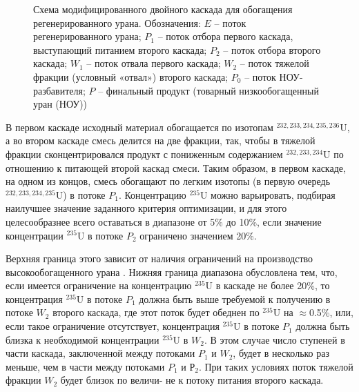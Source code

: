 \begin{figure}[ht]
    \caption{Схема модифицированного двойного каскада для обогащения регенерированного урана. Обозначения: $E$ -- поток регенерированного урана; $P_1$ -- поток отбора первого каскада, выступающий питанием второго каскада; $P_2$ -- поток отбора второго каскада; $W_1$ -- поток отвала первого каскада; $W_2$ -- поток тяжелой фракции (условный «отвал») второго каскада; $P_0$ -- поток НОУ-разбавителя; $P$ -- финальный продукт (товарный низкообогащенный уран (НОУ))}\label{p2left}
\end{figure}

В первом каскаде исходный материал обогащается по изотопам $^{232,233,234,235,236}$U, а во втором каскаде смесь делится на две фракции, так, чтобы в тяжелой фракции сконцентрировался продукт с пониженным содержанием $^{232,233,234}$U по отношению к питающей второй каскад смеси. Таким образом, в первом каскаде, на одном из концов, смесь обогащают по легким изотопы (в первую очередь $^{232,233,234,235}$U) в потоке $P_1$.
Концентрацию $^{235}$U можно варьировать, подбирая наилучшее значение заданного критерия оптимизации, и для этого целесообразнее всего оставаться в диапазоне от 5\% до 10\%, если значение концентрации $^{235}$U в потоке $P_2$ ограничено значением 20\%.

Верхняя граница этого зависит от наличия ограничений на производство высокообогащенного урана \cite{brownOriginsSignificanceLimit2016}.
Нижняя граница диапазона обусловлена тем, что, если имеется ограничение на концентрацию $^{235}$U в каскаде не более 20\%, то концентрация $^{235}$U в потоке $P_1$ должна быть выше требуемой к получению в потоке $W_2$ второго каскада, где этот поток будет обеднен по $^{235}$U на $\approx$0.5\%, или, если такое ограничение отсутствует, концентрация $^{235}$U в потоке $P_1$ должна быть близка к необходимой концентрации $^{235}$U в $W_2$. В этом случае число ступеней в части каскада, заключенной между потоками $P_1$ и $W_2$, будет в несколько раз меньше, чем в части между потоками  $P_1$ и $Р_2$. При таких условиях поток тяжелой фракции $W_2$ будет близок по величи-
не к потоку питания второго каскада.

